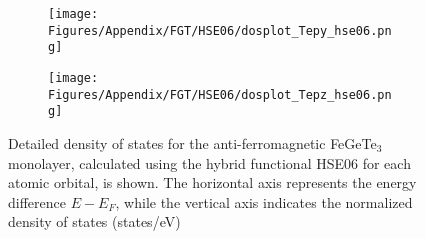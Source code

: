 \begin{figure}[H]
\hfill
\begin{subfigure}{0.24\textwidth}
    \texttt{[image: Figures/Appendix/FGT/HSE06/dosplot\_Tepy\_hse06.png]}
    \label{dosplot_FeTepy_hse06}
\end{subfigure}
\begin{subfigure}{0.24\textwidth}
    \texttt{[image: Figures/Appendix/FGT/HSE06/dosplot\_Tepz\_hse06.png]}
    \label{dosplot_FeTepz_hse06}
\end{subfigure}
\hfill
     \caption{Detailed density of states for the anti-ferromagnetic FeGeTe$_3$ monolayer, calculated using the hybrid functional HSE06 for each atomic orbital, is shown. The horizontal axis represents the energy difference $E - E_F$, while the vertical axis indicates the normalized density of states (states/eV)}
     \label{Fehse06}
 \end{figure}
